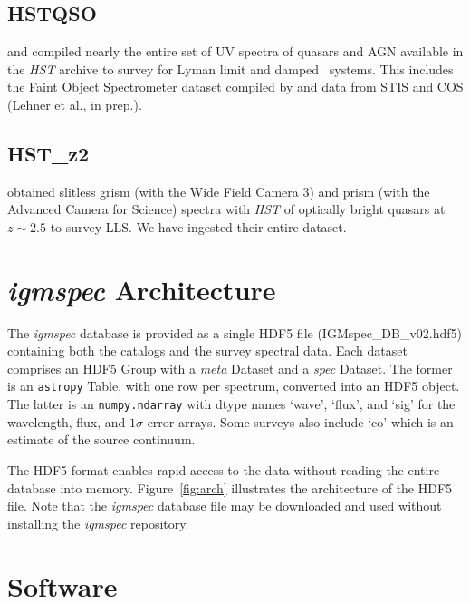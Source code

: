 \documentclass[12pt]{elsarticle}
\begin{document}
\subsection{HSTQSO}
\label{sec:hstqso}

\cite{ribaudo11} and \cite{neeleman+16}
compiled nearly the entire set of UV spectra of 
quasars and AGN available in the {\it HST} archive
to survey for Lyman limit and damped \lya\ systems.
This includes the Faint Object Spectrometer dataset
compiled by \cite{bechtold02} and data from STIS
and COS (Lehner et al., in prep.).

\subsection{HST\_z2}
\label{sec:hstz2}

\cite{omeara11,omeara13} obtained slitless grism
(with the Wide Field Camera 3) and prism (with the
Advanced Camera for Science) spectra with {\it HST}
of optically bright quasars at $z \sim 2.5$
to survey LLS.  We have ingested their entire dataset.

\section{{\it igmspec} Architecture}
\label{sec:arch}

The {\it igmspec} database is provided as a single HDF5 file
(IGMspec\_DB\_v02.hdf5)
containing both the catalogs and the survey spectral data.  
Each dataset comprises an HDF5 Group
with a {\it meta} Dataset and a {\it spec} Dataset.
The former is an {\tt astropy} Table, with one row per
spectrum, converted into an HDF5 object.
The latter is an {\tt numpy.ndarray} 
with dtype names `wave', `flux', and `sig' for the
wavelength, flux, and $1\sigma$ error arrays.
Some surveys also include `co' which is an estimate of the source
continuum.  

The HDF5 format enables rapid access to the data without
reading the entire database into memory.  
Figure~\ref{fig:arch} illustrates the 
architecture of the HDF5 file.
Note that the {\it igmspec} database file may be
downloaded and used without installing the {\it igmspec}
repository.


\section{Software}
\label{sec:software}
\end{document}
